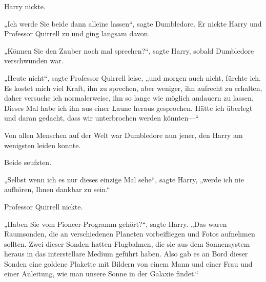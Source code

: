 Harry nickte.

„Ich werde Sie beide dann alleine lassen“, sagte Dumbledore. Er nickte Harry und Professor Quirrell zu und ging langsam davon.

„Können Sie den Zauber noch mal sprechen?“, sagte Harry, sobald Dumbledore verschwunden war.

„Heute nicht“, sagte Professor Quirrell leise, „und morgen auch nicht, fürchte ich. Es kostet mich viel Kraft, ihn zu sprechen, aber weniger, ihn aufrecht zu erhalten, daher versuche ich normalerweise, ihn so lange wie möglich andauern zu lassen. Dieses Mal habe ich ihn aus einer Laune heraus gesprochen. Hätte ich überlegt und daran gedacht, dass wir unterbrochen werden könnten—“

Von allen Menschen auf der Welt war Dumbledore nun jener, den Harry am wenigsten leiden konnte.

Beide seufzten.

„Selbst wenn ich es nur dieses einzige Mal sehe“, sagte Harry, „werde ich nie aufhören, Ihnen dankbar zu sein.“

Professor Quirrell nickte.

„Haben Sie vom Pioneer-Programm gehört?“, sagte Harry. „Das waren Raumsonden, die an verschiedenen Planeten vorbeifliegen und Fotos aufnehmen sollten. Zwei dieser Sonden hatten Flugbahnen, die sie aus dem Sonnensystem heraus in das interstellare Medium geführt haben. Also gab es an Bord dieser Sonden eine goldene Plakette mit Bildern von einem Mann und einer Frau und einer Anleitung, wie man unsere Sonne in der Galaxie findet.“

